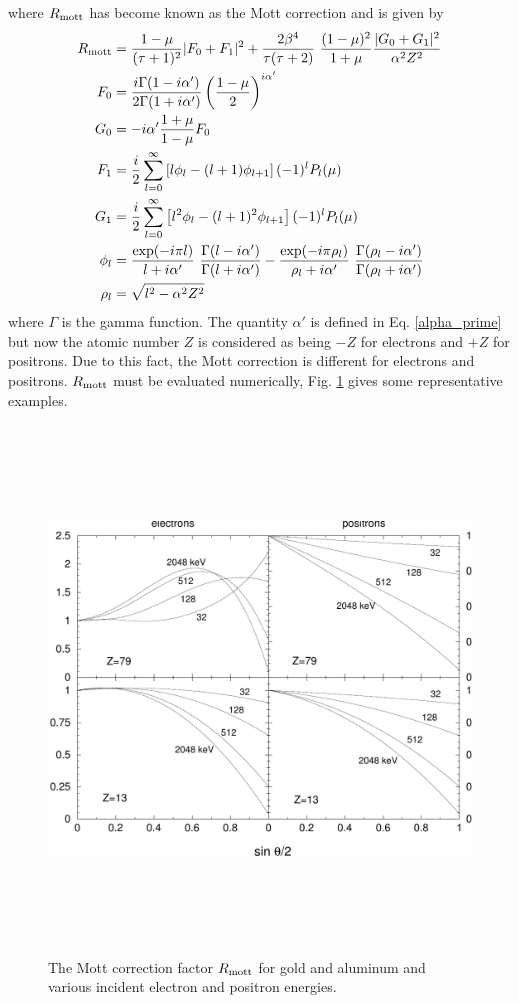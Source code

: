 where $R_{\rm mott}$ has become known as the Mott correction
and is given by
\begin{equation}
\begin{split}
R_{\rm mott} & = {1 - \mu \over (\tau + 1)^2} |F_0 + F_1|^2 +
{2 \beta^4 \over \tau (\tau + 2)}~{(1 - \mu)^2 \over 1 + \mu}
{|G_0 + G_1|^2 \over \alpha^2 Z^2} \\
F_0 & = {i \Gamma(1 - i \alpha') \over 2 \Gamma(1 + i \alpha')}
\left( {1 - \mu \over 2} \right)^{i \alpha'} \\
G_0 & = -i \alpha' {1 + \mu \over 1 - \mu} F_0 \\
F_1 & = \frac{i}{2} \sum_{l=0}^\infty \left[ l \phi_l - (l+1) \phi_{l+1}
\right] (-1)^l P_l(\mu) \\
G_1 & = \frac{i}{2} \sum_{l=0}^\infty \left[ l^2 \phi_l - (l+1)^2 \phi_{l+1}
\right] (-1)^l P_l(\mu) \\
\phi_l &= {\exp(-i \pi l) \over l + i \alpha'} ~ {\Gamma(l - i \alpha')
\over \Gamma(l + i \alpha') } - {\exp(-i \pi \rho_l) \over
\rho_l + i \alpha'}~ {\Gamma(\rho_l - i \alpha') \over
\Gamma(\rho_l + i \alpha') } \\
\rho_l & = \sqrt{ l^2 - \alpha^2 Z^2 }
\end{split}
\end{equation}
where $\Gamma$ is the gamma function. The quantity $\alpha'$ is defined
in Eq. \eqref{alpha_prime} but now the atomic number $Z$ is considered
as being $-Z$ for electrons and $+Z$ for positrons. Due to
this fact, the Mott correction is different for electrons and positrons.
$R_{\rm mott}$ must be evaluated numerically, Fig. \ref{fig_mott} gives some
representative examples.
\begin{figure}[htp]
\includegraphics[height=14cm,width=14cm]{figures/mott1}
\caption[The Mott correction]{\label{fig_mott} The Mott correction factor
$R_{\rm mott}$ for gold and aluminum and various incident
electron and positron energies.}
\end{figure}

